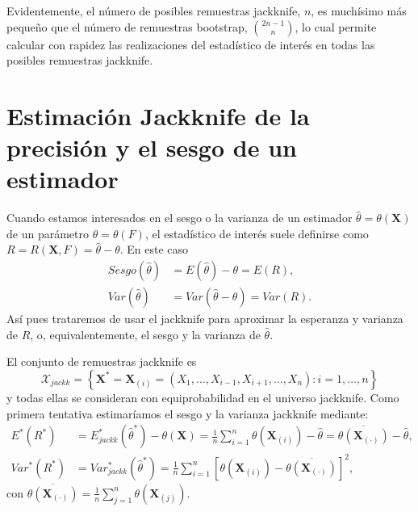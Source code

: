 \documentclass[
]{book}
\theoremstyle{break}
\theoremstyle{definition}
\theoremstyle{definition}
\theoremstyle{definition}
\theoremstyle{definition}
\theoremstyle{remark}
\begin{document}
Evidentemente, el número de posibles remuestras jackknife, \(n\), es
muchísimo más pequeño que el número de remuestras bootstrap,
\(\binom{2n-1}{n}\), lo cual permite calcular con rapidez las realizaciones
del estadístico de interés en todas las posibles remuestras jackknife.

\hypertarget{estimaciuxf3n-jackknife-de-la-precisiuxf3n-y-el-sesgo-de-un-estimador}{%
\section{Estimación Jackknife de la precisión y el sesgo de un estimador}\label{estimaciuxf3n-jackknife-de-la-precisiuxf3n-y-el-sesgo-de-un-estimador}}

Cuando estamos interesados en el sesgo o la varianza de un estimador
\(\hat{\theta}=\theta \left( \mathbf{X} \right)\) de un parámetro
\(\theta =\theta \left( F \right)\), el estadístico de interés suele
definirse como
\(R=R\left( \mathbf{X},F \right) =\hat{\theta}-\theta\).
En este caso
\[\begin{aligned}
Sesgo\left( \hat{\theta} \right) &= E\left( \hat{\theta} \right) -\theta
=E\left( R \right), \\
Var\left( \hat{\theta} \right) &= Var\left( \hat{\theta}-\theta \right)
=Var\left( R \right).
\end{aligned}\]
Así pues trataremos de usar el
jackknife para aproximar la esperanza y varianza de \(R\), o,
equivalentemente, el sesgo y la varianza de \(\hat{\theta}\).

El conjunto de remuestras jackknife es
\[\mathcal{X}_{jackk}=\left\{ \mathbf{X}^{\ast}=
\mathbf{X}_{(i)}=\left( X_1,\ldots ,X_{i-1},X_{i+1},\ldots
,X_n \right) : i=1,\ldots ,n\right\}\]
y todas ellas se consideran con
equiprobabilidad en el universo jackknife. Como primera tentativa
estimaríamos el sesgo y la varianza jackknife mediante:
\[\begin{aligned}
E^{\ast}\left( R^{\ast} \right) &= E_{jackk}^{\ast}\left( \hat{\theta}
^{\ast} \right) -\theta \left( \mathbf{X} \right) =\frac{1}{n}
\sum_{i=1}^{n}\theta \left( \mathbf{X}_{(i)} \right) -
\hat{\theta}=\overline{\theta \left( \mathbf{X}_{(\cdot)} \right)}-\hat{\theta}, \\
Var^{\ast}\left( R^{\ast} \right) &= Var_{jackk}^{\ast}\left( \hat{\theta}
^{\ast} \right) =\frac{1}{n}\sum_{i=1}^{n}\left[ \theta \left( 
\mathbf{X}_{(i)} \right) -\overline{\theta \left( 
\mathbf{X}_{(\cdot)} \right)}\right]^2,
\end{aligned}\]
con \(\overline{\theta \left( \mathbf{X}_{(\cdot)} \right)} = \frac{1}{n}\sum_{j=1}^{n}\theta \left( \mathbf{X}_{(j)} \right)\).
\end{document}

